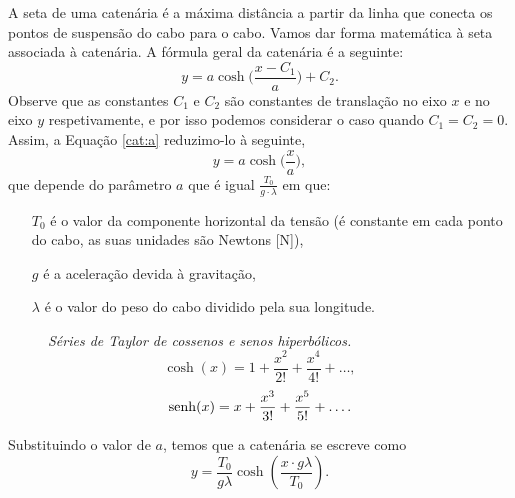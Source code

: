 A seta de uma catenária é a máxima distância a partir da linha que conecta os pontos de suspensão do cabo para o cabo. Vamos dar forma matemática à seta associada à catenária. A fórmula geral da catenária é a seguinte:
\begin{equation}\label{cat:a}
  y = a\cosh\Big(\frac{x-C_1}{a}\Big)+C_2.
\end{equation}
Observe que as constantes $C_1$ e $C_2$ são constantes de translação no eixo $x$ e no eixo $y$ respetivamente, e por isso podemos considerar o caso quando $C_1 = C_2 = 0$. Assim, a Equação \ref{cat:a} reduzimo-lo à seguinte,
\begin{equation}\label{cat:b}
  y = a\cosh\Big(\frac{x}{a}\Big),
\end{equation}
que depende do parâmetro $a$ que é igual $\frac{T_0}{g\cdot\lambda}$ em que:
\begin{itemize}[noitemsep,nolistsep]
\item[$T_0$] é o valor da componente horizontal da tensão
(é constante em cada ponto do cabo, as suas unidades são Newtons [\si{N}]),
\item[$g$] é a aceleração devida à gravitação,
\item[$\lambda$] é o valor do peso do cabo dividido pela sua longitude.
\end{itemize}


\begin{figure}
  \vspace{-2.1cm}
  \begin{mybox}
    \centering
    \emph{\textcolor{bluesol}{Séries de Taylor de cossenos e senos hiperbólicos.}}
    \begin{equation}
      \label{eq:10}
      \cosh(x)=1+\frac{x^2}{2!}+\frac{x^4}{4!}+\ldots,
    \end{equation}
    \begin{equation}
      \label{eq:11}
      \operatorname{senh}(x)=x+\frac{x^3}{3!}+\frac{x^5}{5!}+\ldots.
    \end{equation}
  \end{mybox}
  \vspace{-.8cm}
\end{figure}





Substituindo o valor de $a$, temos que a catenária se escreve como
\begin{equation}\label{cat:c}
  y = \frac{T_0}{g \lambda}\cosh \left(\frac{x\cdot g \lambda}{T_0} \right).
\end{equation}


